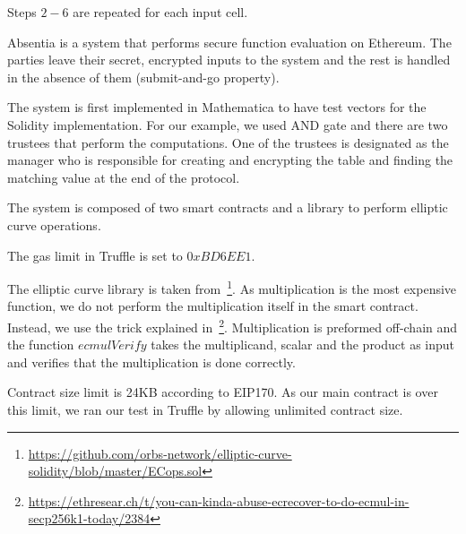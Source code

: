 


Steps $2-6$ are repeated for each input cell.

Absentia is a system that performs secure function evaluation on Ethereum. The parties leave their secret, encrypted inputs to the system and the rest is handled in the absence of them (submit-and-go property).

The system is first implemented in Mathematica to have test vectors for the Solidity implementation. For our example, we used AND gate and there are two trustees that perform the computations. One of the trustees is designated as the manager who is responsible for creating and encrypting the table and finding the matching value at the end of the protocol.

The system is composed of two smart contracts and a library to perform elliptic curve operations.

The gas limit in Truffle is set to $0xBD6EE1$.

The elliptic curve library is taken from~\footnote{\url{https://github.com/orbs-network/elliptic-curve-solidity/blob/master/ECops.sol}}. As multiplication is the most expensive function, we do not perform the multiplication itself in the smart contract. Instead, we use the trick explained in~\footnote{\url{https://ethresear.ch/t/you-can-kinda-abuse-ecrecover-to-do-ecmul-in-secp256k1-today/2384}}. Multiplication is preformed off-chain and the function $ecmulVerify$ takes the multiplicand, scalar and the product as input and verifies that the multiplication is done correctly.

Contract size limit is 24KB according to EIP170. As our main contract is over this limit, we ran our test in Truffle by allowing unlimited contract size.


